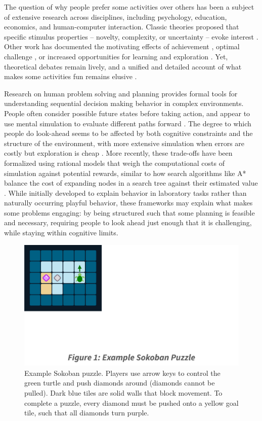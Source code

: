 \documentclass[10pt,letterpaper]{article}
\begin{document}
The question of why people prefer some activities over others has been a subject of extensive research across disciplines, including psychology, education, economics, and human-computer interaction. Classic theories proposed that specific stimulus properties -- novelty, complexity, or uncertainty -- evoke interest \cite{berlyne1960conflict}.
Other work has documented the motivating effects of achievement \cite{harackiewicz1993achievement}, optimal challenge \cite{czikszentmihalyi1990flow}, or increased opportunities for learning and exploration \cite{Oudeyer2007, Baranes2014, brandle2023empowerment}. 
Yet, theoretical debates remain lively, and a unified and detailed account of what makes some activities fun remains elusive \cite{Andersen2023, chu2020play}.

Research on human problem solving and planning provides formal tools for understanding sequential decision making behavior in complex environments. 
People often consider possible future states before taking action, and appear to use mental simulation to evaluate different paths forward \cite{newell1979reasoning}.
The degree to which people do look-ahead seems to be affected by both cognitive constraints and the structure of the environment, with more extensive simulation when errors are costly but exploration is cheap \cite{gureckis2012self, dasgupta2018learning}.
More recently, these trade-offs have been formalized using rational models that weigh the computational costs of simulation against potential rewards, similar to how search algorithms like A* balance the cost of expanding nodes in a search tree against their estimated value \cite{callaway2022rational}. 
While initially developed to explain behavior in laboratory tasks rather than naturally occurring playful behavior, these frameworks may explain what makes some problems engaging: by being structured such that some planning is feasible and necessary, requiring people to look ahead just enough that it is challenging, while staying within cognitive limits. 

\begin{figure}[t]
    \centering
    \includegraphics[width=0.5\linewidth]{figures/fig1.pdf}
        \caption{Example Sokoban puzzle. Players use arrow keys to control the green turtle and push diamonds around (diamonds cannot be pulled). Dark blue tiles are solid walls that block movement. To complete a puzzle, every diamond must be pushed onto a yellow goal tile, such that all diamonds turn purple.}
        \label{fig:sokoban}        
\end{figure}
\end{document}
